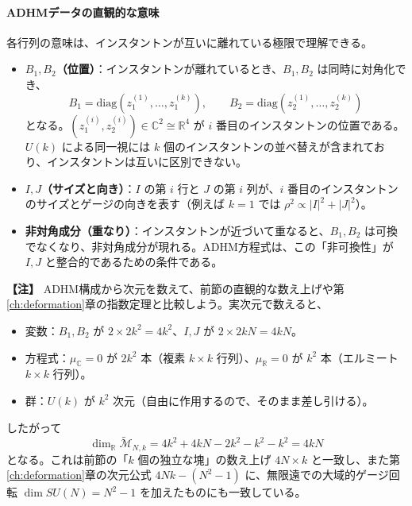 \documentclass[uplatex, dvipdfmx, book]{jsbook}
\newenvironment{note}{\vspace{1ex}\par\footnotesize\noindent\textbf{【注】}}{\par\vspace{1ex}}
\begin{document}
\paragraph{ADHMデータの直観的な意味}
各行列の意味は、インスタントンが互いに離れている極限で理解できる。
\begin{itemize}
    \item \textbf{$B_1, B_2$（位置）}：インスタントンが離れているとき、$B_1, B_2$ は同時に対角化でき、
    \begin{equation*}
        B_1 = \mathrm{diag}(z_1^{(1)}, \dots, z_1^{(k)}), \qquad B_2 = \mathrm{diag}(z_2^{(1)}, \dots, z_2^{(k)})
    \end{equation*}
    となる。$(z_1^{(i)}, z_2^{(i)}) \in \mathbb{C}^2 \cong \mathbb{R}^4$ が $i$ 番目のインスタントンの位置である。$U(k)$ による同一視には $k$ 個のインスタントンの並べ替えが含まれており、インスタントンは互いに区別できない。
    \item \textbf{$I, J$（サイズと向き）}：$I$ の第 $i$ 行と $J$ の第 $i$ 列が、$i$ 番目のインスタントンのサイズとゲージの向きを表す（例えば $k = 1$ では $\rho^2 \propto |I|^2 + |J|^2$）。
    \item \textbf{非対角成分（重なり）}：インスタントンが近づいて重なると、$B_1, B_2$ は可換でなくなり、非対角成分が現れる。ADHM方程式は、この「非可換性」が $I, J$ と整合的であるための条件である。
\end{itemize}

\begin{note}
ADHM構成から次元を数えて、前節の直観的な数え上げや第\ref{ch:deformation}章の指数定理と比較しよう。実次元で数えると、
\begin{itemize}
    \item 変数：$B_1, B_2$ が $2 \times 2k^2 = 4k^2$、$I, J$ が $2 \times 2kN = 4kN$。
    \item 方程式：$\mu_{\mathbb{C}} = 0$ が $2k^2$ 本（複素 $k \times k$ 行列）、$\mu_{\mathbb{R}} = 0$ が $k^2$ 本（エルミート $k \times k$ 行列）。
    \item 群：$U(k)$ が $k^2$ 次元（自由に作用するので、そのまま差し引ける）。
\end{itemize}
したがって
\begin{equation*}
    \dim_{\mathbb{R}} \widetilde{\mathcal{M}}_{N,k} = 4k^2 + 4kN - 2k^2 - k^2 - k^2 = 4kN
\end{equation*}
となる。これは前節の「$k$ 個の独立な塊」の数え上げ $4N \times k$ と一致し、また第\ref{ch:deformation}章の次元公式 $4Nk - (N^2 - 1)$ に、無限遠での大域的ゲージ回転 $\dim SU(N) = N^2 - 1$ を加えたものにも一致している。
\end{note}
\end{document}
